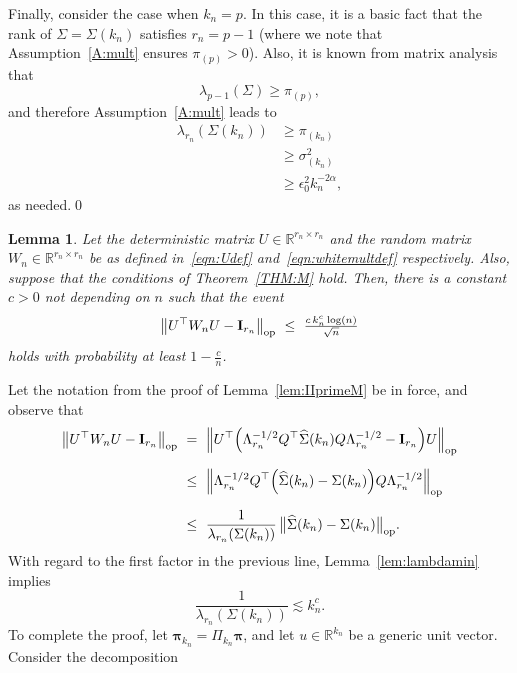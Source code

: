 \documentclass[aos,preprint]{imsart}
\numberwithin{equation}{section}
\theoremstyle{plain}
\newtheorem{lemma}{Lemma}[section]
\newcommand{\R}{\mathbb{R}}
\renewcommand{\hat}[1]{\widehat{#1}}
\newcommand{\e}{\epsilon}
\newcommand{\ttop}{^{\top}}
\newcommand{\op}{_{\textup{op}}}
\newcommand{\ts}{\textstyle}
\newcommand{\1}{{\bf{1}}}
\newcommand{\0}{\mathbf{0}}
\begin{document}
Finally, consider the case when $k_n=p$. In this case, it is a basic fact that the rank of $\Sigma=\Sigma(k_n)$ satisfies $r_n=p-1$ (where we note that  Assumption~\ref{A:mult} ensures $\pi_{(p)}>0$). Also, it is known from matrix analysis~\citep[Theorem 1]{Benasseni:2012} that 
$$\lambda_{p-1}(\Sigma)\geq \pi_{(p)},$$
and therefore Assumption~\ref{A:mult} leads to
\begin{equation}
\begin{split}
\lambda_{r_n}(\Sigma(k_n))&\geq \pi_{(k_n)}\\[0.2cm]
%
&\geq\sigma_{(k_n)}^2\\[0.2cm]
%
&\geq \e_0^2 k_n^{-2\alpha},
%
\end{split}
\end{equation}
as needed.\qed


\begin{lemma}\label{lem:whitemult} 
Let the deterministic matrix $U\in\R^{r_n\times r_n}$ and the random matrix $W_n\in\R^{r_n\times r_n}$ be as defined in~\eqref{eqn:Udef} and~\eqref{eqn:whitemultdef} respectively. Also, suppose that the conditions of Theorem~\ref{THM:M} hold. Then, there is a constant $c>0$ not depending on $n$ such that the event
\begin{equation}
\big\|U\ttop W_n U-\mathbf{I}_{r_n}\big\|_{\textup{op}}\ \leq \ \ts\frac{c\, k_n^c \log(n)}{\sqrt n}
\end{equation}
holds with probability at least $1-\frac cn$.
\end{lemma}
\proof Let the notation from the proof of Lemma~\ref{lem:IIprimeM} be in force, and observe that
\footnotesize
\begin{equation*}
\begin{split}
\big\|U\ttop W_n U-\mathbf{I}_{r_n}\big\|_{\textup{op}} & \ = \ \Big\|U\ttop\Big(\Lambda_{r_n}^{-1/2}Q\ttop \hat\Sigma(k_n) Q\Lambda_{r_n}^{-1/2} - \mathbf{I}_{r_n}\Big)U\Big\|\op\\[0.2cm]
%
& \ \leq \ \Big\|\Lambda_{r_n}^{-1/2}Q\ttop \Big(\hat\Sigma(k_n) -\Sigma(k_n)\Big)Q\Lambda_{r_n}^{-1/2}\Big\|\op\\[0.2cm]
%
& \ \leq \ \frac{1}{\lambda_{r_n}(\Sigma(k_n))} \, \big\|\hat\Sigma(k_n)-\Sigma(k_n)\big\|\op.
\end{split}
\end{equation*}
\normalsize
With regard to the first factor in the previous line, Lemma~\ref{lem:lambdamin} implies
$$\ts\frac{1}{\lambda_{r_n}(\Sigma(k_n))} \lesssim k_n^c.$$
To complete the proof, let $\boldsymbol\pi_{k_n}=\Pi_{k_n}\boldsymbol \pi$, and let $u\in\R^{k_n}$ be a generic unit vector. Consider the decomposition
\end{document}
